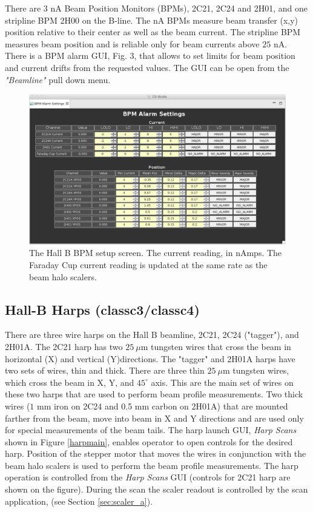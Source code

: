 \documentclass[12pt]{article}
\begin{document}
There are 3 nA Beam Position Monitors (BPMs), 2C21, 2C24 and 2H01, and one stripline BPM 2H00 on the B-line. The nA BPMs measure beam transfer (x,y) position relative to their center as well as the beam current. The stripline BPM measures beam position and is reliable only for beam currents above $25$ nA. There is a BPM alarm GUI, Fig. 3,
that allows to set limits for beam position and current drifts from the requested values. The GUI can be open from the \emph{"Beamline"} pull down menu.
\begin{figure}[tbhp]
{\centering \includegraphics[scale=0.5, angle=90]{bpms.pdf} \par}
\caption{The Hall B BPM setup screen. The current reading, in nAmps. The Faraday Cup current
reading is updated at the same rate as the beam halo scalers. \label{fig:bpm}}
\end{figure}

\subsection{Hall-B Harps (classc3/classc4)\label{sec:harp}}
\indent

There are three wire harps on the Hall B beamline, 2C21, 2C24 ("tagger"), and 2H01A. The 2C21 harp has two $25~\mu$m tungsten wires that cross the beam in horizontal (X) and vertical (Y)directions. The "tagger" and 2H01A harps have two sets of wires, thin and thick. There are three thin $25~\mu$m tungsten wires, which cross the beam in X, Y, and $45^\circ$ axis. This are the main set of wires on these two harps that are used to perform beam profile measurements. Two thick wires ($1$ mm iron on 2C24 and 0.5 mm carbon on 2H01A) that are mounted farther from the beam, move into beam in X and Y directions and are used only for special measurements of the beam tails. The harp launch GUI, {\it Harp Scans} shown in Figure \ref{harpmain}, enables operator to open controls for the desired harp. Position of the stepper motor that moves the wires in conjunction
with the beam halo scalers is used to perform the beam profile measurements. The harp operation is controlled from the {\it Harp Scans} GUI (controls for 2C21 harp are shown on the figure). During the scan the scaler readout is controlled by the scan application,  (see Section \ref{sec:scaler_a}).
\end{document}
